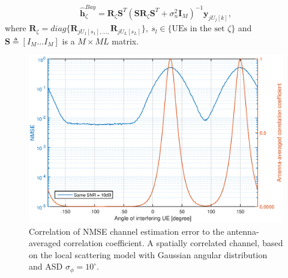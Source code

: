 \begin{equation}
\hat{\mathbf{h}}_{\zeta}^{Bay}=\mathbf{R}_{\zeta}\mathbf{S}^{T}(\mathbf{S}\mathbf{R}_{\zeta}\mathbf{S}^{T}+\sigma_{n}^{2}\mathbf{I}_{M})^{-1}\mathbf{y}_{jU_{j}[k]},
\end{equation}
where $\mathbf{R}_{\zeta}=diag\{\mathbf{R}_{jU_{1}[s_{1}],...,}\mathbf{R}_{jU_{L}[s_{L}]}\},\:s_{l}\in \{\text{UEs in the set } \zeta\}$ and $\mathbf{S}\triangleq[I_{M}...I_{M}]$ is a $M\times ML$ matrix.


\begin{figure}[t!]
	\centering
	\includegraphics[width=1.0\linewidth]{figures/NMSE_correlation.eps}
	\caption{Correlation of NMSE channel estimation error to the antenna-averaged correlation coefficient. A spatially correlated channel, based on
the local scattering model with Gaussian angular distribution and ASD $ \sigma_\phi= 10^\circ$.}
	\label{fig:channelhardendingvsantnumber}
\end{figure}



